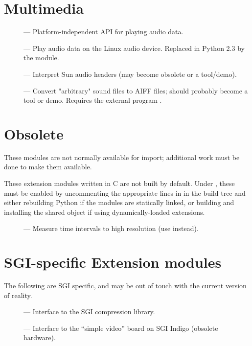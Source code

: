 \section{Multimedia}

\begin{description}
\item[]
--- Platform-independent API for playing audio data.

\item[]
--- Play audio data on the Linux audio device.  Replaced in Python 2.3
    by the  module.

\item[]
--- Interpret Sun audio headers (may become obsolete or a tool/demo).

\item[]
--- Convert "arbitrary" sound files to AIFF files; should probably
    become a tool or demo.  Requires the external program .
\end{description}


\section{Obsolete \label{obsolete-modules}}

These modules are not normally available for import; additional work
must be done to make them available.


These extension modules written in C are not built by default.
Under \UNIX, these must be enabled by uncommenting the appropriate
lines in  in the build tree and either rebuilding
Python if the modules are statically linked, or building and
installing the shared object if using dynamically-loaded extensions.


\begin{description}
\item[]
--- Measure time intervals to high resolution (use 
    instead).
\end{description}

\section{SGI-specific Extension modules}

The following are SGI specific, and may be out of touch with the
current version of reality.

\begin{description}
\item[]
--- Interface to the SGI compression library.

\item[]
--- Interface to the ``simple video'' board on SGI Indigo
    (obsolete hardware).
\end{description}
